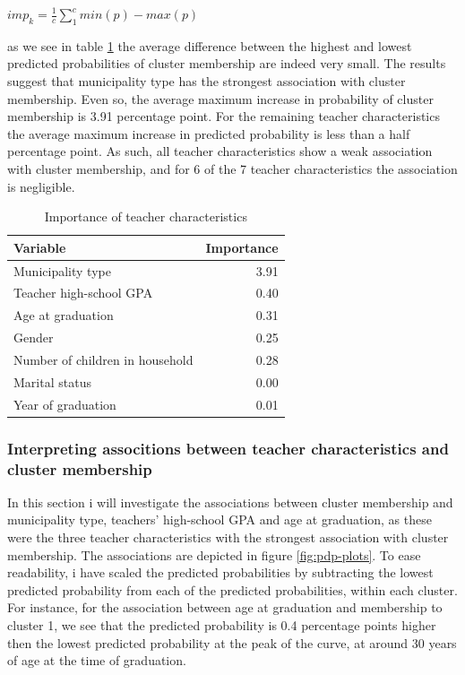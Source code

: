 \documentclass[
]{article}
\begin{document}
\(imp_k=\frac{1}{c}\sum_{1}^{c}min(p)-max(p)\)

as we see in table \ref{tab:varimp} the average difference between the highest and lowest predicted probabilities of cluster membership are indeed very small. The results suggest that municipality type has the strongest association with cluster membership. Even so, the average maximum increase in probability of cluster membership is 3.91 percentage point. For the remaining teacher characteristics the average maximum increase in predicted probability is less than a half percentage point. As such, all teacher characteristics show a weak association with cluster membership, and for 6 of the 7 teacher characteristics the association is negligible.

\begin{table}

\caption{\label{tab:varimp}Importance of teacher characteristics}
\centering
\begin{tabular}[t]{l|r}
\hline
Variable & Importance\\
\hline
Municipality type & 3.91\\
\hline
Teacher high-school GPA & 0.40\\
\hline
Age at graduation & 0.31\\
\hline
Gender & 0.25\\
\hline
Number of children in household & 0.28\\
\hline
Marital status & 0.00\\
\hline
Year of graduation & 0.01\\
\hline
\end{tabular}
\end{table}

\hypertarget{interpreting-associtions-between-teacher-characteristics-and-cluster-membership}{%
\subsubsection{Interpreting associtions between teacher characteristics and cluster membership}\label{interpreting-associtions-between-teacher-characteristics-and-cluster-membership}}

In this section i will investigate the associations between cluster membership and municipality type, teachers' high-school GPA and age at graduation, as these were the three teacher characteristics with the strongest association with cluster membership. The associations are depicted in figure \ref{fig:pdp-plots}. To ease readability, i have scaled the predicted probabilities by subtracting the lowest predicted probability from each of the predicted probabilities, within each cluster. For instance, for the association between age at graduation and membership to cluster 1, we see that the predicted probability is 0.4 percentage points higher then the lowest predicted probability at the peak of the curve, at around 30 years of age at the time of graduation.
\end{document}

